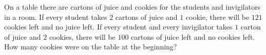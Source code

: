 On a table there are cartons of juice and cookies for the students and invigilators in a room. If every student takes $2$ cartons of juice and $1$ cookie, there will be $121$ cookies left and no juice left. If every student and every invigilator takes $1$ carton of juice and $2$ cookies, there will be $100$ cartons of juice left and no cookies left. How many cookies were on the table at the beginning?
